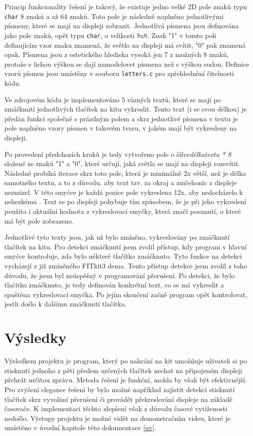 \documentclass[14pt]{extarticle}
\begin{document}
    Princip funkcionality řešení je takový, že existuje jedno velké 2D pole znaků typu \texttt{char}  8 znaků a  až 64 znaků. Toto pole je následně naplněno jednotlivými písmeny, které se mají na displeji zobrazit. Jednotlivá písmena jsou definována jako pole znaků, opět typu \texttt{char}, o velikosti 8x8. Znak "1" v tomto poli definujícím vzor znaku znamená, že světlo na displeji má svítit, "0" pak znamená opak. Písmena jsou z estetického hlediska vysoká jen 7 z možných 8 znaků, protože s lichou výškou se dají namodelovet  písmena než s výškou sudou. Definice vzorů písmen jsou umístěny v souboru \texttt{letters.c} pro zpřehlednění čitelnosti kódu.
    
    Ve zdrojovém kódu je implementováno 5 různých textů, které se mají po zmáčknutí jednotlivých tlačítek na kitu vykreslit. Tento text (i se svou délkou) je předán funkci společně s prázdným polem a skrz jednotlivé písmena v textu je pole naplněno vzory písmen v takovém tvaru, v jakém mají být vykresleny na displeji.
    
    Po provedení předchozích kroků je tedy vytvořeno pole o šířce\linebreak \textit{délka\textunderscore textu * 8} složené ze znaků "1" a "0", které určují, jaká světla se mají na displeji rozsvítit. Následně probíhá iterace skrz toto pole, která je minimálně 2x větší, než je délka samotného textu, a to z důvodu, aby text tzv.  za okraj a zničehonic z displeje nezmizel. V této smyčce je každá pozice pole vykreslena 12x, aby nedocházelo k nehezkému . Text se po displeji pohybuje tím způsobem, že je při jeho vykreslení použita i aktuální hodnota z vykreslovací smyčky, která značí posunutí, o které má být pole zobrazeno. 
    
    Jednotlivé tyto texty jsou, jak už bylo zmíněno, vykreslovány po zmáčknutí tlačítek na kitu. Pro detekci zmáčknutí jsem zvolil přístup, kdy program v hlavní smyčce kontroluje, zda bylo některé tlačítko zmáčknuto. Tyto funkce na detekci vycházejí z již zmíněného FITkit3 dema. Tento přístup detekce jsem zvolil z toho důvodu, že jsem byl neúspěšný v programování přerušení. Po detekci, že bylo tlačítko zmáčknuto, je tedy definován konkrétní text, co se má vykreslit a spuštěna vykreslovací smyčka. Po jejím skončení začně program opět kontrolovat, jestli došlo k dalšímu zmáčknutí tlačítka.
    
    \section{Výsledky}
    Výsledkem projektu je program, který po nahrání na kit umožňuje uživateli si po stisknutí jednoho z pěti předem určených tlačítek nechat na připojeném displeji přehrát určitou zprávu. Metoda řešení je funkční, mohla by však být efektivnější. Pro zvýšení elegance řešení by bylo možné například zajistit detekci stisknutí tlačítek skrz vyvolání přerušení či provádět překreslování displeje na základě časovače. K implementaci těchto zlepšení však z důvodu časové vytíženosti nedošlo. Výstupy projektu je možné vidět na demonstračním videu, které je umístěno v úvodní kapitole této dokumentace \ref{uv}.
    
\end{document}
